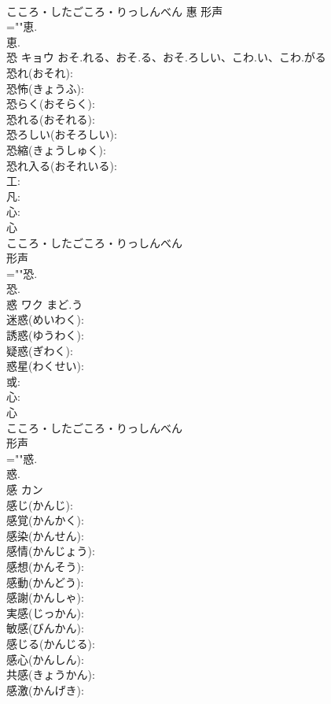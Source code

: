 \documentclass[8pt]{extreport}
\begin{document}
\begin{CJK}{UTF8}{min}
\\	こころ・したごころ・りっしんべん	惠	形声 
\\	=""恵.
\\	恵.
\\	恐	キョウ	おそ.れる、おそ.る、おそ.ろしい、こわ.い、こわ.がる		
\\	恐れ(おそれ): 
\\	恐怖(きょうふ): 
\\	恐らく(おそらく): 
\\	恐れる(おそれる): 
\\	恐ろしい(おそろしい): 
\\	恐縮(きょうしゅく): 
\\	恐れ入る(おそれいる): 
\\	工: 
\\	凡: 
\\	心: 
\\	心	
\\	こころ・したごころ・りっしんべん	
\\	形声 
\\	=""恐.
\\	恐.
\\	惑	ワク	まど.う		
\\	迷惑(めいわく): 
\\	誘惑(ゆうわく): 
\\	疑惑(ぎわく): 
\\	惑星(わくせい): 
\\	或: 
\\	心: 
\\	心	
\\	こころ・したごころ・りっしんべん	
\\	形声 
\\	=""惑.
\\	惑.
\\	感	カン			
\\	感じ(かんじ): 
\\	感覚(かんかく): 
\\	感染(かんせん): 
\\	感情(かんじょう): 
\\	感想(かんそう): 
\\	感動(かんどう): 
\\	感謝(かんしゃ): 
\\	実感(じっかん): 
\\	敏感(びんかん): 
\\	感じる(かんじる): 
\\	感心(かんしん): 
\\	共感(きょうかん): 
\\	感激(かんげき): 

\end{CJK}
\end{document}
